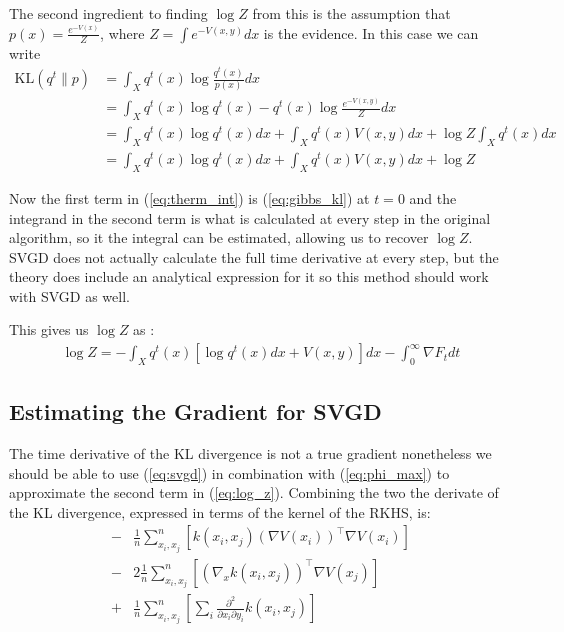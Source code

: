 \documentclass{article}
\begin{document}
The second ingredient to finding $\log Z$ from this is the assumption that $p(x) = \frac{ e^{-V(x)} }{ Z }$, 
where $Z = \int e^{-V(x, y)} dx$ is the evidence. In this case we can write
\begin{align}
\label{eq:gibbs_kl}
    \text{KL}( q^t \| p ) &= \int_X q^t(x) \log \frac{ q^t(x) }{ p(x) } dx \\
                    &= \int_X q^t(x) \log q^t(x) - q^t(x) \log \frac{ e^{-V(x, y)} }{ Z } dx \\
                    &= \int_X q^t(x) \log q^t(x) dx + \int_X q^t(x) V(x, y) dx + \log Z \int_X q^t(x) dx \\
                    &= \int_X q^t(x) \log q^t(x) dx + \int_X q^t(x) V(x, y) dx + \log Z
\end{align}

Now the first term in (\ref{eq:therm_int}) is (\ref{eq:gibbs_kl}) at $t=0$ and the integrand in the second term is
what is calculated at every step in the original algorithm, so it the integral can be estimated, allowing us to 
recover $\log Z$. SVGD does not actually calculate the full time derivative at every step, but the theory does 
include an analytical expression for it so this method should work with SVGD as well.

This gives us $\log Z$ as :
\begin{align}
\label{eq:log_z}
    \log Z = - \int_X q^t(x) [\log q^t(x) dx +  V(x, y)] dx 
        - \int_0^\infty \nabla F_t dt
\end{align}


\subsection{Estimating the Gradient for SVGD}
The time derivative of the KL divergence is not a true gradient nonetheless we should be able to use
(\ref{eq:svgd}) in combination with (\ref{eq:phi_max}) to approximate the second term in (\ref{eq:log_z}).
Combining the two the derivate of the KL divergence, expressed in terms of the kernel of the RKHS, is:
\begin{align}
    \label{eq:F_approximation}
    -& \frac{1}{n}\sum_{x_i,x_j}^n \left[ k(x_i,x_j) (\nabla V(x_i))^\top \nabla V(x_i) \right] \\ 
    -& 2 \frac{1}{n}\sum_{x_i,x_j}^n \left[ (\nabla_x k(x_i,x_j) )^\top \nabla V(x_j) \right] \\ 
    +& \frac{1}{n}\sum_{x_i,x_j}^n \left[ \sum_i \frac{ \partial^2 }{ \partial x_i \partial y_i } 
        k(x_i,x_j) \right]
\end{align}
\end{document}
